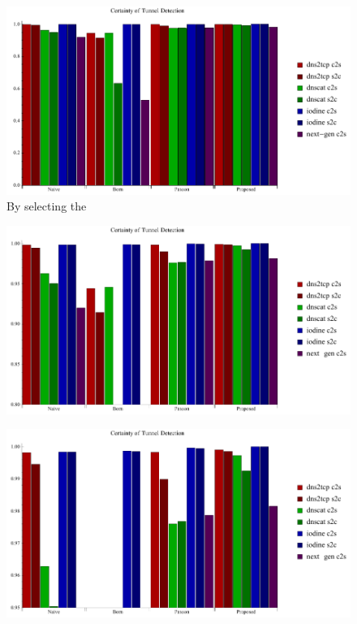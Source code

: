 \documentclass[12pt]{report}
\theoremstyle{remark}
\theoremstyle{definition}
\theoremstyle{definition}
\theoremstyle{definition}
\begin{document}
\begin{figure}
\centering
\includegraphics[width=\textwidth]{figures/cplot.pdf}
\caption[Plot of Certainty of Detection by Tunnel Application and Detection Method]{By selecting the }
\label{cplot}
\end{figure}
\begin{figure}
\centering
\includegraphics[width=\textwidth]{figures/cplot2.pdf}
\caption[Plot of Certainty of Detection by Tunnel Application and Detection Method - 0.80 to 1.00]{}
\label{cplot80}
\end{figure}
\begin{figure}
\centering
\includegraphics[width=\textwidth]{figures/cplot3.pdf}
\caption[Plot of Certainty of Detection by Tunnel Application and Detection Method - 0.95 to 1.00]{}
\label{cplot95}
\end{figure}
\end{document}
